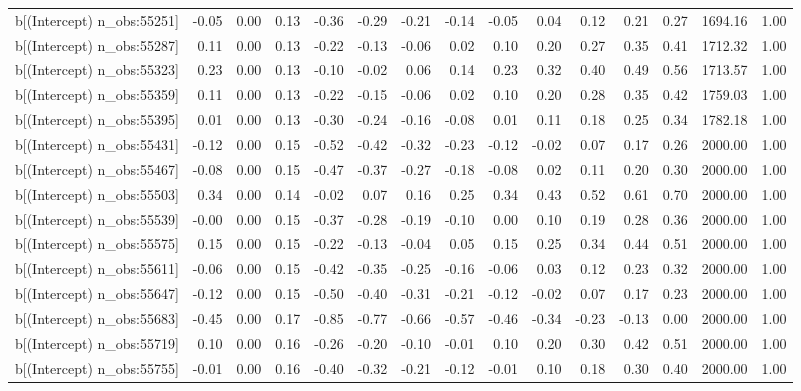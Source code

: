 \begin{table}[ht]
\begin{tabular}{rrrrrrrrrrrrrrr}
  b[(Intercept) n\_obs:55251] & -0.05 & 0.00 & 0.13 & -0.36 & -0.29 & -0.21 & -0.14 & -0.05 & 0.04 & 0.12 & 0.21 & 0.27 & 1694.16 & 1.00 \\ 
  b[(Intercept) n\_obs:55287] & 0.11 & 0.00 & 0.13 & -0.22 & -0.13 & -0.06 & 0.02 & 0.10 & 0.20 & 0.27 & 0.35 & 0.41 & 1712.32 & 1.00 \\ 
  b[(Intercept) n\_obs:55323] & 0.23 & 0.00 & 0.13 & -0.10 & -0.02 & 0.06 & 0.14 & 0.23 & 0.32 & 0.40 & 0.49 & 0.56 & 1713.57 & 1.00 \\ 
  b[(Intercept) n\_obs:55359] & 0.11 & 0.00 & 0.13 & -0.22 & -0.15 & -0.06 & 0.02 & 0.10 & 0.20 & 0.28 & 0.35 & 0.42 & 1759.03 & 1.00 \\ 
  b[(Intercept) n\_obs:55395] & 0.01 & 0.00 & 0.13 & -0.30 & -0.24 & -0.16 & -0.08 & 0.01 & 0.11 & 0.18 & 0.25 & 0.34 & 1782.18 & 1.00 \\ 
  b[(Intercept) n\_obs:55431] & -0.12 & 0.00 & 0.15 & -0.52 & -0.42 & -0.32 & -0.23 & -0.12 & -0.02 & 0.07 & 0.17 & 0.26 & 2000.00 & 1.00 \\ 
  b[(Intercept) n\_obs:55467] & -0.08 & 0.00 & 0.15 & -0.47 & -0.37 & -0.27 & -0.18 & -0.08 & 0.02 & 0.11 & 0.20 & 0.30 & 2000.00 & 1.00 \\ 
  b[(Intercept) n\_obs:55503] & 0.34 & 0.00 & 0.14 & -0.02 & 0.07 & 0.16 & 0.25 & 0.34 & 0.43 & 0.52 & 0.61 & 0.70 & 2000.00 & 1.00 \\ 
  b[(Intercept) n\_obs:55539] & -0.00 & 0.00 & 0.15 & -0.37 & -0.28 & -0.19 & -0.10 & 0.00 & 0.10 & 0.19 & 0.28 & 0.36 & 2000.00 & 1.00 \\ 
  b[(Intercept) n\_obs:55575] & 0.15 & 0.00 & 0.15 & -0.22 & -0.13 & -0.04 & 0.05 & 0.15 & 0.25 & 0.34 & 0.44 & 0.51 & 2000.00 & 1.00 \\ 
  b[(Intercept) n\_obs:55611] & -0.06 & 0.00 & 0.15 & -0.42 & -0.35 & -0.25 & -0.16 & -0.06 & 0.03 & 0.12 & 0.23 & 0.32 & 2000.00 & 1.00 \\ 
  b[(Intercept) n\_obs:55647] & -0.12 & 0.00 & 0.15 & -0.50 & -0.40 & -0.31 & -0.21 & -0.12 & -0.02 & 0.07 & 0.17 & 0.23 & 2000.00 & 1.00 \\ 
  b[(Intercept) n\_obs:55683] & -0.45 & 0.00 & 0.17 & -0.85 & -0.77 & -0.66 & -0.57 & -0.46 & -0.34 & -0.23 & -0.13 & 0.00 & 2000.00 & 1.00 \\ 
  b[(Intercept) n\_obs:55719] & 0.10 & 0.00 & 0.16 & -0.26 & -0.20 & -0.10 & -0.01 & 0.10 & 0.20 & 0.30 & 0.42 & 0.51 & 2000.00 & 1.00 \\ 
  b[(Intercept) n\_obs:55755] & -0.01 & 0.00 & 0.16 & -0.40 & -0.32 & -0.21 & -0.12 & -0.01 & 0.10 & 0.18 & 0.30 & 0.40 & 2000.00 & 1.00 \\ 

\end{tabular}
\end{table}
